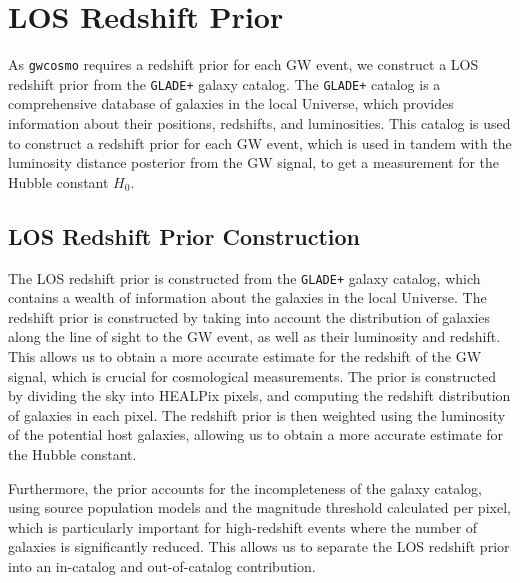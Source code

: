 \newpage

\section{\Ac{LOS} Redshift Prior}

As \texttt{gwcosmo} requires a redshift prior for each \ac{GW} event, we construct a \ac{LOS} redshift prior from the \texttt{GLADE+} galaxy catalog. The \texttt{GLADE+} catalog is a comprehensive database of galaxies in the local Universe, which provides information about their positions, redshifts, and luminosities. This catalog is used to construct a redshift prior for each \ac{GW} event, which is used in tandem with the luminosity distance posterior from the \ac{GW} signal, to get a measurement for the Hubble constant $H_0$.

\subsection{\ac{LOS} Redshift Prior Construction}
The \ac{LOS} redshift prior is constructed from the \texttt{GLADE+} galaxy catalog, which contains a wealth of information about the galaxies in the local Universe. The redshift prior is constructed by taking into account the distribution of galaxies along the line of sight to the \ac{GW} event, as well as their luminosity and redshift. This allows us to obtain a more accurate estimate for the redshift of the \ac{GW} signal, which is crucial for cosmological measurements. The prior is constructed by dividing the sky into HEALPix pixels, and computing the redshift distribution of galaxies in each pixel. The redshift prior is then weighted using the luminosity of the potential host galaxies, allowing us to obtain a more accurate estimate for the Hubble constant.

Furthermore, the prior accounts for the incompleteness of the galaxy catalog, using source population models and the magnitude threshold calculated per pixel, which is particularly important for high-redshift events where the number of galaxies is significantly reduced. This allows us to separate the \ac{LOS} redshift prior into an in-catalog and out-of-catalog contribution.

